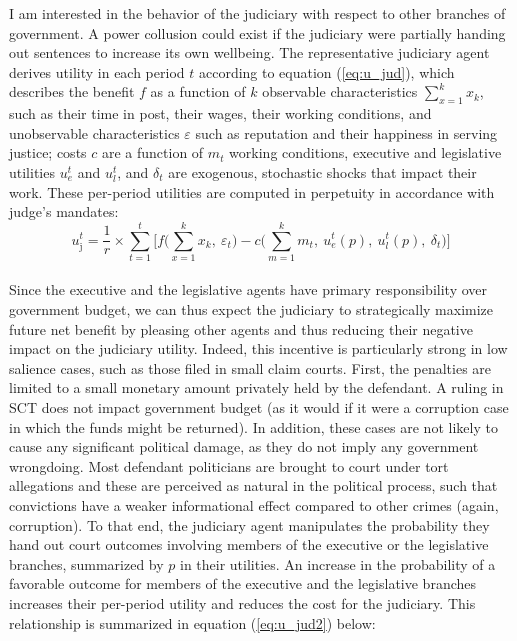 \documentclass[11pt]{article}
\newcommand{\refp}[1]{(\ref{#1})}
\begin{document}
I am interested in the behavior of the judiciary with respect to other branches of government. A power collusion could exist if the judiciary were partially handing out sentences to increase its own wellbeing. The representative judiciary agent derives utility in each period $t$ according to equation \refp{eq:u_jud}, which describes the benefit $f$ as a function of $k$ observable characteristics $\sum_{x = 1}^{k}x_{k}$, such as their time in post, their wages, their working conditions, and unobservable characteristics $\varepsilon$ such as reputation and their happiness in serving justice; costs $c$ are a function of $m_{t}$ working conditions, executive and legislative utilities $u_{e}^{t}$ and $u_{l}^{t}$, and $\delta_{t}$ are exogenous, stochastic shocks that impact their work. These per-period utilities are computed in perpetuity in accordance with judge's mandates: \\

\begin{equation} \label{eq:u_jud}
  u_{\text{j}}^{t} = \frac{1}{r} \times \sum_{t = 1}^{t} \Bigg[ f\Big(\sum_{x = 1}^{k}x_{k}, \ \varepsilon_{t} \Big) - c\Big(\sum_{m = 1}^{k} m_{t}, \ u_{e}^{t}(p), \ u_{l}^{t}(p), \ \delta_{t}\Big) \Bigg]
\end{equation} \\

Since the executive and the legislative agents have primary responsibility over government budget, we can thus expect the judiciary to strategically maximize future net benefit by pleasing other agents and thus reducing their negative impact on the judiciary utility. Indeed, this incentive is particularly strong in low salience cases, such as those filed in small claim courts. First, the penalties are limited to a small monetary amount privately held by the defendant. A ruling in SCT does not impact government budget (as it would if it were a corruption case in which the funds might be returned). In addition, these cases are not likely to cause any significant political damage, as they do not imply any government wrongdoing. Most defendant politicians are brought to court under tort allegations and these are perceived as natural in the political process, such that convictions have a weaker informational effect compared to other crimes (again, corruption). To that end, the judiciary agent manipulates the probability they hand out court outcomes involving members of the executive or the legislative branches, summarized by $p$ in their utilities. An increase in the probability of a favorable outcome for members of the executive and the legislative branches increases their per-period utility and reduces the cost for the judiciary. This relationship is summarized in equation \refp{eq:u_jud2} below: \\
\end{document}
